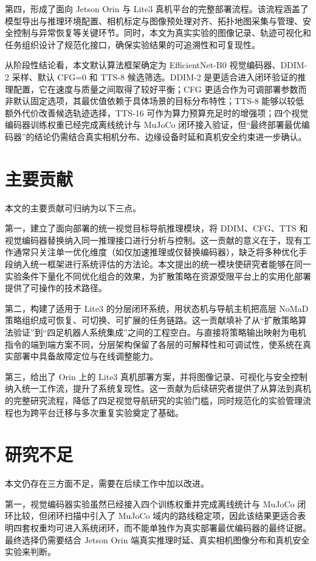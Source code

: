 第四，形成了面向 Jetson Orin 与 Lite3 真机平台的完整部署流程。该流程涵盖了模型导出与推理环境配置、相机标定与图像预处理对齐、拓扑地图采集与管理、安全控制与异常恢复等关键环节。同时，本文为真实实验的图像记录、轨迹可视化和任务组织设计了规范化接口，确保实验结果的可追溯性和可复现性。

从阶段性结论看，本文默认算法框架确定为 EfficientNet-B0 视觉编码器、DDIM-2 采样、默认 CFG=0 和 TTS-8 候选筛选。DDIM-2 是更适合进入闭环验证的推理配置，它在速度与质量之间取得了较好平衡；CFG 更适合作为可调部署参数而非默认固定选项，其最优值依赖于具体场景的目标分布特性；TTS-8 能够以较低额外代价改善候选轨迹选择，TTS-16 可作为算力预算充足时的增强项；四个视觉编码器训练权重已经完成离线统计与 MuJoCo 闭环接入验证，但``最终部署最优编码器''的结论仍需结合真实相机分布、边缘设备时延和真机安全约束进一步确认。

\section{主要贡献}

本文的主要贡献可归纳为以下三点。

第一，建立了面向部署的统一视觉目标导航推理模块，将 DDIM、CFG、TTS 和视觉编码器替换纳入同一推理接口进行分析与控制。这一贡献的意义在于，现有工作通常只关注单一优化维度（如仅加速推理或仅替换编码器），缺乏将多种优化手段纳入统一框架进行系统评估的方法论。本文提出的统一模块使研究者能够在同一实验条件下量化不同优化组合的效果，为扩散策略在资源受限平台上的实用化部署提供了可操作的技术路径。

第二，构建了适用于 Lite3 的分层闭环系统，用状态机与导航主机把高层 NoMaD 策略组织成可恢复、可切换、可扩展的任务链路。这一贡献填补了从``扩散策略算法验证''到``四足机器人系统集成''之间的工程空白。与直接将策略输出映射为电机指令的端到端方案不同，分层架构保留了各层的可解释性和可调试性，使系统在真实部署中具备故障定位与在线调整能力。

第三，给出了 Orin 上的 Lite3 真机部署方案，并将图像记录、可视化与安全控制纳入统一工作流，提升了系统复现性。这一贡献为后续研究者提供了从算法到真机的完整研究流程，降低了四足视觉导航研究的实验门槛，同时规范化的实验管理流程也为跨平台迁移与多次重复实验奠定了基础。

\section{研究不足}

本文仍存在三方面不足，需要在后续工作中加以改进。

第一，视觉编码器实验虽然已经接入四个训练权重并完成离线统计与 MuJoCo 闭环比较，但闭环扫描中引入了 MuJoCo 域内的路线稳定项，因此该结果更适合表明四套权重均可进入系统闭环，而不能单独作为真实部署最优编码器的最终证据。最终选择仍需要结合 Jetson Orin 端真实推理时延、真实相机图像分布和真机安全实验来判断。

